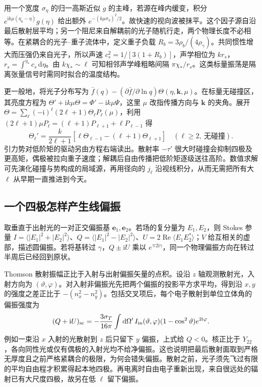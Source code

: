 用一个宽度 $\sigma_\eta$ 的归一高斯近似 $g$ 的主峰，若源在峰内缓变，积分 $e^{\mathrm i k\mu(\eta_0-\eta)}g(\eta)$ 给出额外 $e^{-(k\mu\sigma_\eta)^2/2}$。故快速的视向波被抹平。这个因子源自沿最后散射层平均；另一个阻尼来自解耦前的光子随机行走，两个物理长度不必相等。在紧耦合的光子--重子流体中，定义重子负载 $R_b=3\rho_b/(4\rho_\gamma)$。共同惯性增大而压强仍来自光子，所以声速 $c_s^2=1/[3(1+R_b)]$，声学相位为 $k r_s$，$r_s=\int^{\eta_*}c_s\,\mathrm d\eta$。由 $k\chi_*\sim\ell$ 可知相邻声学峰粗略间隔 $\pi\chi_*/r_s$。这类标量振荡是隔离张量信号时需同时拟合的温度结构。

更一般地，将光子分布写为 $\bar f(q)-(\partial\bar f/\partial\ln q)\Theta(\eta,\bm k,\mu)$。在标量无碰撞区，其亮度方程为 $\Theta'+\mathrm i k\mu\Theta=\Phi'-\mathrm i k\mu\Psi$，这里 $\mu$ 改指传播方向与 $\bm k$ 的夹角。展开 $\Theta=\sum_\ell(-\mathrm i)^\ell(2\ell+1)\Theta_\ell P_\ell(\mu)$，利用 $(2\ell+1)\mu P_\ell=(\ell+1)P_{\ell+1}+\ell P_{\ell-1}$ 得
\[
 \Theta_\ell'=\frac{k}{2\ell+1}[\ell\Theta_{\ell-1}-(\ell+1)\Theta_{\ell+1}]
 \quad(\ell\ge2,\ \text{无碰撞}).
\]
引力势对低阶矩的驱动另由方程右端读出。散射率 $-\tau'$ 很大时碰撞会抑制四极及更高矩，偶极被拉向重子速度；解耦后自由传播把低阶矩逐级送往高阶。数值求解可先演化碰撞与势构成的局域源，再用径向的 $j_\ell$ 沿视线积分，从而无需把所有大 $\ell$ 从早期一直推进到今天。

\subsection{一个四极怎样产生线偏振}

取垂直于出射光的一对正交偏振基 $\bm e_1,\bm e_2$。若场的复分量为 $E_1,E_2$，则 Stokes 参量 $I=\langle|E_1|^2+|E_2|^2\rangle$、$Q=\langle|E_1|^2-|E_2|^2\rangle$、$U=2\operatorname{Re}\langle E_1 E_2^*\rangle$；$V$ 给互相关的虚部，描述圆偏振。若将基转过 $\gamma$，$Q\pm\mathrm i U$ 乘以 $e^{\mp2\mathrm i\gamma}$，同一个物理偏振方向在转过半周后已经回到原状。

Thomson 散射振幅正比于入射与出射偏振矢量的点积。设沿 $z$ 轴观测散射光，入射方向为 $(\vartheta,\varphi)$。对入射非偏振光先把两个偏振的投影平方求平均，得到沿 $x,y$ 的强度之差正比于 $-(n_x^2-n_y^2)$。包括交叉项后，每个电子散射到单位立体角的偏振强度为
\[
 (Q+\mathrm i U)_{\rm sc}
 =-\frac{3\sigma_T}{16\pi}
 \int \mathrm d\Omega'\,I_{\rm in}(\vartheta,\varphi)
       (1-\cos^2\vartheta)e^{2\mathrm i\varphi}.
\]
例如一束沿 $x$ 入射的光散射到 $z$ 后只留下 $y$ 偏振，上式给 $Q<0$。核正比于 $Y_{22}$，各向同性光或仅有偶极的入射光均不给净偏振。这也说明把最后散射面取到严格无厚度且之前严格紧耦合的极限，为何会错失偏振。散射之前，光子须先飞过有限的平均自由程才积累得起本地四极。再电离时自由电子重新出现，来自很远处的辐射已有大尺度四极，故另在低 $\ell$ 留下偏振。

